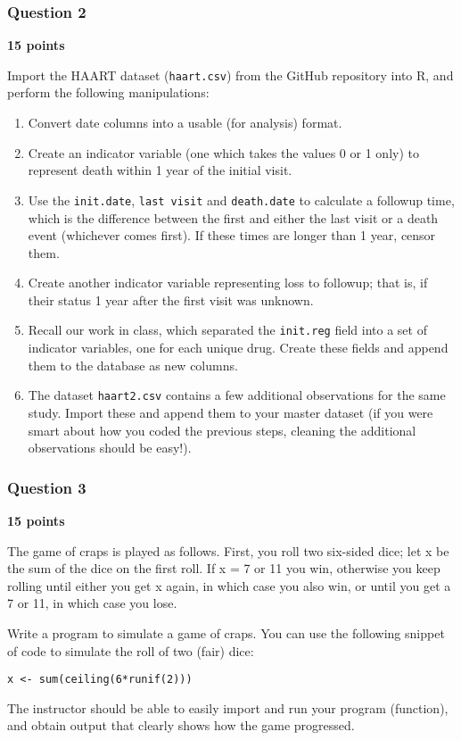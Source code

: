 \documentclass[]{article}
\begin{document}
\subsubsection{Question 2}

\textbf{15 points}

Import the HAART dataset (\texttt{haart.csv}) from the GitHub repository
into R, and perform the following manipulations:

\begin{enumerate}[1.]
\item
  Convert date columns into a usable (for analysis) format.
\item
  Create an indicator variable (one which takes the values 0 or 1 only)
  to represent death within 1 year of the initial visit.
\item
  Use the \texttt{init.date}, \texttt{last visit} and
  \texttt{death.date} to calculate a followup time, which is the
  difference between the first and either the last visit or a death
  event (whichever comes first). If these times are longer than 1 year,
  censor them.
\item
  Create another indicator variable representing loss to followup; that
  is, if their status 1 year after the first visit was unknown.
\item
  Recall our work in class, which separated the \texttt{init.reg} field
  into a set of indicator variables, one for each unique drug. Create
  these fields and append them to the database as new columns.
\item
  The dataset \texttt{haart2.csv} contains a few additional observations
  for the same study. Import these and append them to your master
  dataset (if you were smart about how you coded the previous steps,
  cleaning the additional observations should be easy!).
\end{enumerate}

\subsubsection{Question 3}

\textbf{15 points}

The game of craps is played as follows. First, you roll two six-sided
dice; let x be the sum of the dice on the first roll. If x = 7 or 11 you
win, otherwise you keep rolling until either you get x again, in which
case you also win, or until you get a 7 or 11, in which case you lose.

Write a program to simulate a game of craps. You can use the following
snippet of code to simulate the roll of two (fair) dice:

\begin{verbatim}
x <- sum(ceiling(6*runif(2)))
\end{verbatim}

The instructor should be able to easily import and run your program
(function), and obtain output that clearly shows how the game
progressed.
\end{document}
